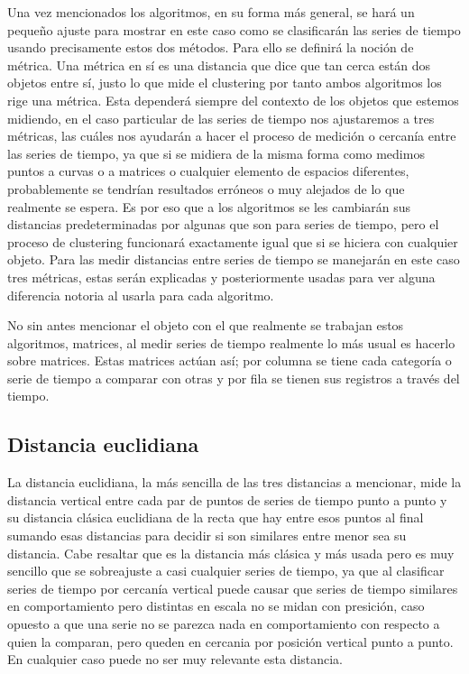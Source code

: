 \documentclass[12pt,a4paper]{article}
\begin{document}
Una vez mencionados los algoritmos, en su forma más general, se hará un pequeño ajuste para mostrar en este caso
como se clasificarán las series de tiempo usando precisamente estos dos métodos. Para ello se definirá la noción de métrica. Una 
métrica en sí es una distancia que dice que tan cerca están dos objetos entre sí, justo lo que mide el clustering
por tanto ambos algoritmos los rige una métrica. Esta dependerá siempre del contexto de los objetos que estemos midiendo,
en el caso particular de las series de tiempo nos ajustaremos a tres métricas, las cuáles nos ayudarán a hacer el proceso 
de medición o cercanía entre las series de tiempo, ya que si se midiera de la misma forma como medimos puntos a curvas o a matrices o cualquier elemento de espacios diferentes, probablemente se tendrían resultados
erróneos o muy alejados de lo que realmente se espera. Es por eso que a los algoritmos se les cambiarán sus distancias predeterminadas por algunas 
que son para series de tiempo, pero el proceso de clustering funcionará exactamente igual que si se hiciera con cualquier objeto.
Para las medir distancias entre series de tiempo se manejarán en este caso tres métricas, estas serán explicadas y posteriormente usadas para ver
alguna diferencia notoria al usarla para cada algoritmo.

No sin antes mencionar el objeto con el que realmente se trabajan estos algoritmos, matrices, al 
medir series de tiempo realmente lo más usual es hacerlo sobre matrices. Estas matrices actúan así; por columna se tiene cada categoría
o serie de tiempo a comparar con otras y por fila se tienen sus registros a través del tiempo.

\subsection{Distancia euclidiana}

La distancia euclidiana, la más sencilla de las tres distancias a mencionar, mide la distancia vertical entre cada par de puntos de series de tiempo
punto a punto y su distancia clásica euclidiana de la recta que hay entre esos puntos al final sumando esas distancias para decidir si son similares entre menor sea su distancia. 
Cabe resaltar que es la distancia más clásica y más usada pero es muy sencillo que se sobreajuste a 
casi cualquier series de tiempo, ya que al clasificar series de tiempo por cercanía vertical puede causar que series de tiempo similares en comportamiento pero distintas en escala no se midan con presición, caso opuesto a que 
una serie no se parezca nada en comportamiento con respecto a quien la comparan, pero queden en cercania por posición vertical punto a punto. En cualquier caso puede no ser muy relevante esta distancia. 
\end{document}
